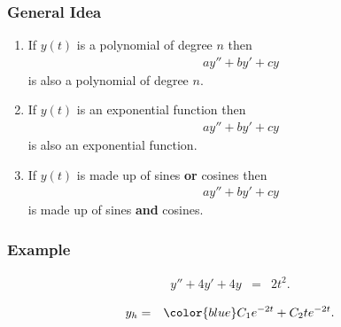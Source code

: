 \begin{frame}
  \frametitle{General Idea}

  \begin{enumerate}
  \item If $y(t)$ is a polynomial of degree $n$ then
    \begin{eqnarray*}
      a y'' + b y' + cy 
    \end{eqnarray*}
    is also a polynomial of degree $n$.
  \item If $y(t)$ is an exponential function then
    \begin{eqnarray*}
      a y'' + by' + cy 
    \end{eqnarray*}
    is also an exponential function.
  \item If $y(t)$ is made up of sines \textbf{or} cosines then
    \begin{eqnarray*}
      a y'' + by' + cy
    \end{eqnarray*}
    is  made up of sines \textbf{and} cosines.
  \end{enumerate}

\end{frame}


\begin{frame}
  \frametitle{Example}

  \begin{eqnarray*}
    y'' + 4y' + 4y & = & 2t^2.
  \end{eqnarray*}

  {
    \begin{eqnarray*}
      y_h & = & {\color{blue}C_1 e^{-2t} + C_2 t e^{-2t}}.
    \end{eqnarray*}
  }

\end{frame}


